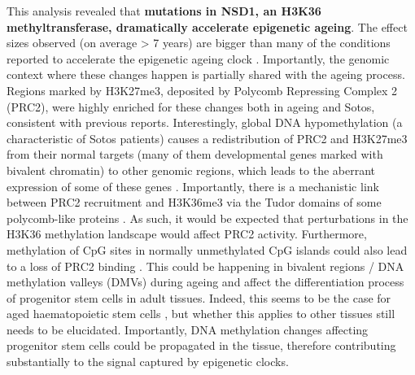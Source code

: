 This analysis revealed that \textbf{mutations in NSD1, an H3K36 methyltransferase, dramatically accelerate epigenetic ageing}. The effect sizes observed (on average > 7 years) are bigger than many of the conditions reported to accelerate the epigenetic ageing clock \cite{Horvath2018}. Importantly, the genomic context where these changes happen is partially shared with the ageing process. Regions marked by H3K27me3, deposited by Polycomb Repressing Complex 2 (\acrshort{PRC2}), were highly enriched for these changes both in ageing and Sotos, consistent with previous reports. Interestingly, global DNA hypomethylation (a characteristic of Sotos patients) causes a redistribution of \acrshort{PRC2} and H3K27me3 from their normal targets (many of them developmental genes marked with bivalent chromatin) to other genomic regions, which leads to the aberrant expression of some of these genes \cite{Reddington2013}. Importantly, there is a mechanistic link between PRC2 recruitment and H3K36me3 via the Tudor domains of some polycomb-like proteins \cite{Cai2013,Li2017}. As such, it would be expected that perturbations in the H3K36 methylation landscape would affect PRC2 activity. Furthermore, methylation of CpG sites in normally unmethylated CpG islands could also lead to a loss of PRC2 binding \cite{Li2017}. This could be happening in bivalent regions / DNA methylation valleys (\acrshort{DMV}s) during ageing and affect the differentiation process of progenitor stem cells in adult tissues. Indeed, this seems to be the case for aged haematopoietic stem cells \cite{Sun2014x,Beerman2013}, but whether this applies to other tissues still needs to be elucidated. Importantly, DNA methylation changes affecting progenitor stem cells could be propagated in the tissue, therefore contributing substantially to the signal captured by epigenetic clocks. 

\bigskip


